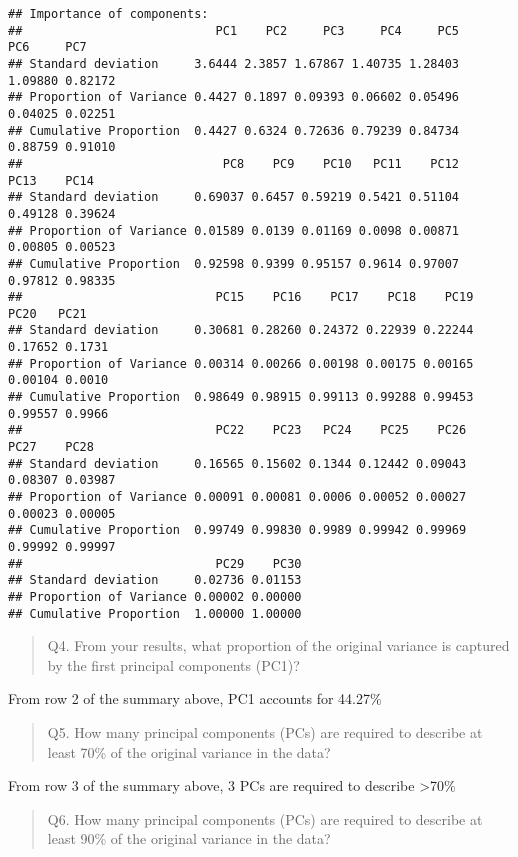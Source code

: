 \documentclass[
]{article}
\begin{document}
\begin{verbatim}
## Importance of components:
##                           PC1    PC2     PC3     PC4     PC5     PC6     PC7
## Standard deviation     3.6444 2.3857 1.67867 1.40735 1.28403 1.09880 0.82172
## Proportion of Variance 0.4427 0.1897 0.09393 0.06602 0.05496 0.04025 0.02251
## Cumulative Proportion  0.4427 0.6324 0.72636 0.79239 0.84734 0.88759 0.91010
##                            PC8    PC9    PC10   PC11    PC12    PC13    PC14
## Standard deviation     0.69037 0.6457 0.59219 0.5421 0.51104 0.49128 0.39624
## Proportion of Variance 0.01589 0.0139 0.01169 0.0098 0.00871 0.00805 0.00523
## Cumulative Proportion  0.92598 0.9399 0.95157 0.9614 0.97007 0.97812 0.98335
##                           PC15    PC16    PC17    PC18    PC19    PC20   PC21
## Standard deviation     0.30681 0.28260 0.24372 0.22939 0.22244 0.17652 0.1731
## Proportion of Variance 0.00314 0.00266 0.00198 0.00175 0.00165 0.00104 0.0010
## Cumulative Proportion  0.98649 0.98915 0.99113 0.99288 0.99453 0.99557 0.9966
##                           PC22    PC23   PC24    PC25    PC26    PC27    PC28
## Standard deviation     0.16565 0.15602 0.1344 0.12442 0.09043 0.08307 0.03987
## Proportion of Variance 0.00091 0.00081 0.0006 0.00052 0.00027 0.00023 0.00005
## Cumulative Proportion  0.99749 0.99830 0.9989 0.99942 0.99969 0.99992 0.99997
##                           PC29    PC30
## Standard deviation     0.02736 0.01153
## Proportion of Variance 0.00002 0.00000
## Cumulative Proportion  1.00000 1.00000
\end{verbatim}

\begin{quote}
Q4. From your results, what proportion of the original variance is
captured by the first principal components (PC1)?
\end{quote}

From row 2 of the summary above, PC1 accounts for 44.27\%

\begin{quote}
Q5. How many principal components (PCs) are required to describe at
least 70\% of the original variance in the data?
\end{quote}

From row 3 of the summary above, 3 PCs are required to describe
\textgreater70\%

\begin{quote}
Q6. How many principal components (PCs) are required to describe at
least 90\% of the original variance in the data?
\end{quote}
\end{document}
